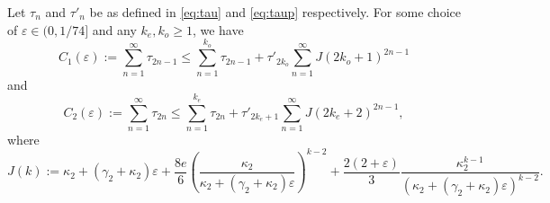 \documentclass[12pt]{amsart}
\begin{document}
\begin{lemma}\label{lemma:exprec}
    Let $\tau_n$ and $\tau'_n$ be as defined in \eqref{eq:tau} and \eqref{eq:taup} respectively. For some choice of $\varepsilon\in(0,1/74]$ and any $k_e,k_o\ge 1$, we have
    \begin{equation}\label{C1sum}
        C_1(\varepsilon):=\sum_{n=1}^{\infty}\tau_{2n-1} \le\sum_{n=1}^{k_o}\tau_{2n-1}+\tau'_{2k_o}\sum_{n=1}^\infty J(2k_o+1)^{2n-1}
    \end{equation}
    and
    \begin{equation}\label{C2sum}
        C_2(\varepsilon):=\sum_{n=1}^{\infty}\tau_{2n} \le\sum_{n=1}^{k_e}\tau_{2n}+\tau'_{2k_e+1}\sum_{n=1}^\infty J(2k_e+2)^{2n-1},
    \end{equation}
    where
    \begin{equation*}
        J(k):=\kappa_2+\left(\gamma_2+\kappa_2\right)\varepsilon+\frac{8e}{6}\left(\frac{\kappa_2}{\kappa_2+\left(\gamma_2+\kappa_2\right)\varepsilon}\right)^{k-2}+\frac{2(2+\varepsilon)}{3}\frac{\kappa_2^{k-1}}{(\kappa_2+\left(\gamma_2+\kappa_2\right)\varepsilon)^{k-2}}.
    \end{equation*}
\end{lemma}
\end{document}
